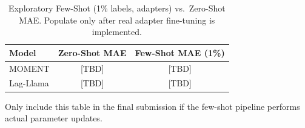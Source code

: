 \begin{table}[htbp]
\caption{Exploratory Few-Shot (1\% labels, adapters) vs.\ Zero-Shot MAE. Populate only after real adapter fine-tuning is implemented.}
\label{tab:few_shot}
\centering
\begin{tabular}{lcc}
\toprule
Model & Zero-Shot MAE & Few-Shot MAE (1\%) \\
\midrule
MOMENT & [TBD] & [TBD] \\
Lag-Llama & [TBD] & [TBD] \\
\bottomrule
\end{tabular}
\vspace{2pt}
\footnotesize{Only include this table in the final submission if the few-shot pipeline performs actual parameter updates.}
\end{table}
